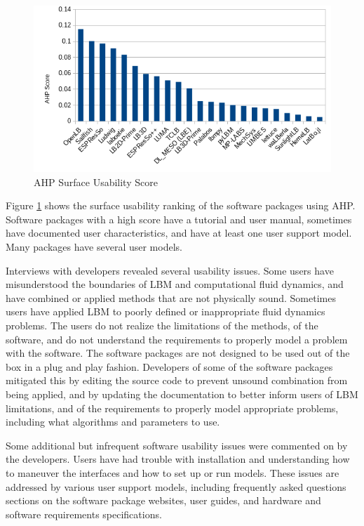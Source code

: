 \documentclass[12pt, notitlepage]{article}
\begin{document}
\begin{figure}[h!]
	\begin{center}
		\includegraphics[width=1.0\textwidth]{usability_chart}
		\caption{AHP Surface Usability Score}
		\label{Fig_Usability}
	\end{center}
\end{figure}

Figure \ref{Fig_Usability} shows the surface usability ranking of the software packages using AHP. Software packages with a high score have a tutorial and user manual, sometimes have documented user characteristics, and have at least one user support model. Many packages have several user models. 

Interviews with developers revealed several usability issues. Some users have misunderstood the boundaries of LBM and computational fluid dynamics, and have combined or applied methods that are not physically sound. Sometimes users have applied LBM to poorly defined or inappropriate fluid dynamics problems. The users do not realize the limitations of the methods, of the software, and do not understand the requirements to properly model a problem with the software. The software packages are not designed to be used out of the box in a plug and play fashion. Developers of some of the software packages mitigated this by editing the source code to prevent unsound combination from being applied, and by updating the documentation to better inform users of LBM limitations, and of the requirements to properly model appropriate problems, including what algorithms and parameters to use. 

Some additional but infrequent software usability issues were commented on by the developers. Users have had trouble with installation and understanding how to maneuver the interfaces and how to set up or run models. These issues are addressed by various user support models, including frequently asked questions sections on the software package websites, user guides, and hardware and software requirements specifications.
\end{document}
